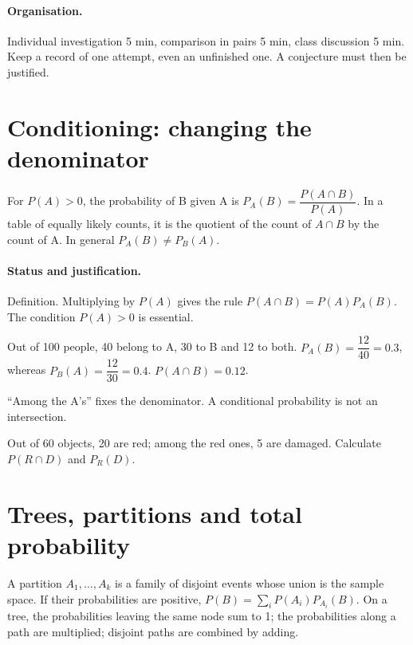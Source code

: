 \paragraph{Organisation.} Individual investigation 5 min, comparison in pairs 5 min, class discussion 5 min. Keep a record of one attempt, even an unfinished one. A conjecture must then be justified.
\section{Conditioning: changing the denominator}\label{C05-U1}
\begin{keypoint}
For $P(A)>0$, the probability of B given A is $P_A(B)=\dfrac{P(A\cap B)}{P(A)}$. In a table of equally likely counts, it is the quotient of the count of $A\cap B$ by the count of A. In general $P_A(B)\ne P_B(A)$.
\end{keypoint}
\paragraph{Status and justification.} Definition. Multiplying by $P(A)$ gives the rule $P(A\cap B)=P(A)P_A(B)$. The condition $P(A)>0$ is essential.
\begin{example}Out of 100 people, 40 belong to A, 30 to B and 12 to both. $P_A(B)=\dfrac{12}{40}=0.3$, whereas $P_B(A)=\dfrac{12}{30}=0.4$. $P(A\cap B)=0.12$.\end{example}\label{C05-EX1}
\begin{pitfall}``Among the A's'' fixes the denominator. A conditional probability is not an intersection.\end{pitfall}
\begin{application}Out of 60 objects, 20 are red; among the red ones, 5 are damaged. Calculate $P(R\cap D)$ and $P_R(D)$.\end{application}\label{C05-AP1}
\section{Trees, partitions and total probability}\label{C05-U2}
\begin{keypoint}
A partition $A_1,\ldots,A_k$ is a family of disjoint events whose union is the sample space. If their probabilities are positive, $P(B)=\sum_iP(A_i)P_{A_i}(B)$. On a tree, the probabilities leaving the same node sum to 1; the probabilities along a path are multiplied; disjoint paths are combined by adding.
\end{keypoint}
